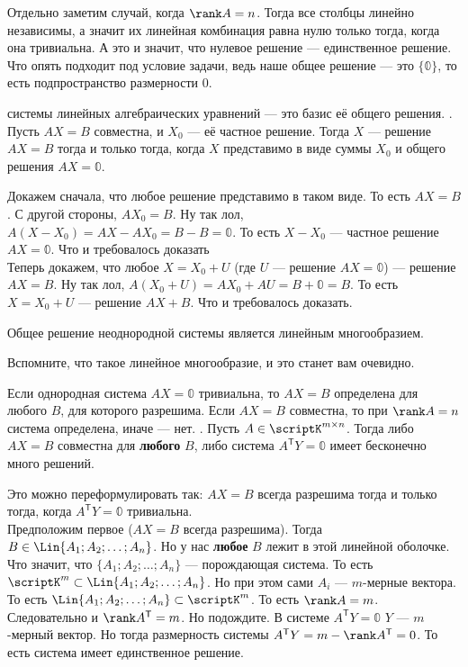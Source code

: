 \documentclass{article}
\newcommand*{\trans}{^{\mathsf T}}
\begin{document}
\begin{itemize}
\begin{Proof}
            Отдельно заметим случай, когда $\rank A=n$. Тогда все столбцы линейно независимы, а значит их линейная комбинация равна нулю только тогда, когда она тривиальна. А это и значит, что нулевое решение --- единственное решение. Что опять подходит под условие задачи, ведь наше общее решение --- это $\{\mathbb0\}$, то есть подпространство размерности 0.
        \end{Proof}
        \dfn {} системы линейных алгебраических уравнений --- это базис её общего решения.
        \thm {}. Пусть $AX=B$ совместна, и $X_0$ --- её частное решение. Тогда $X$ --- решение $AX=B$ тогда и только тогда, когда $X$ представимо в виде суммы $X_0$ и общего решения $AX=\mathbb0$.
        \begin{Proof}
            Докажем сначала, что любое решение представимо в таком виде. То есть $AX=B$. С другой стороны, $AX_0=B$. Ну так лол, $A(X-X_0)=AX-AX_0=B-B=\mathbb0$. То есть $X-X_0$ --- частное решение $AX=\mathbb0$. Что и требовалось доказать\\
            Теперь докажем, что любое $X=X_0+U$ (где $U$ --- решение $AX=\mathbb0$) --- решение $AX=B$. Ну так лол, $A(X_0+U)=AX_0+AU=B+\mathbb0=B$. То есть $X=X_0+U$ --- решение $AX+B$. Что и требовалось доказать.
        \end{Proof}
        \thm Общее решение неоднородной системы является линейным многообразием.
        \begin{Proof}
            Вспомните, что такое линейное многообразие, и это станет вам очевидно.
        \end{Proof}
        \thm Если однородная система $AX=\mathbb0$ тривиальна, то $AX=B$ определена для любого $B$, для которого разрешима.
        \thm Если $AX=B$ совместна, то при $\rank A=n$ система определена, иначе --- нет.
        \thm {}. Пусть $A\in\scriptK^{m\times n}$. Тогда либо $AX=B$ совместна для \textbf{любого} $B$, либо система $A\trans Y=\mathbb0$ имеет бесконечно много решений.
        \begin{Proof}
            Это можно переформулировать так: $AX=B$ всегда разрешима тогда и только тогда, когда $A\trans Y=\mathbb0$ тривиальна.\\
            Предположим первое ($AX=B$ всегда разрешима). Тогда $B\in\Lin\{A_1;A_2;\ldots;A_n\}$. Но у нас \textbf{любое} $B$ лежит в этой линейной оболочке. Что значит, что $\{A_1;A_2;\ldots;A_n\}$ --- порождающая система. То есть $\scriptK^m\subset\Lin\{A_1;A_2;\ldots;A_n\}$. Но при этом сами $A_i$ --- $m$-мерные вектора. То есть $\Lin\{A_1;A_2;\ldots;A_n\}\subset\scriptK^m$. То есть $\rank A=m$. Следовательно и $\rank A\trans=m$. Но подождите. В системе $A\trans Y=\mathbb0$ $Y$ --- $m$-мерный вектор. Но тогда размерность системы $A\trans Y=m-\rank A\trans=0$. То есть система имеет единственное решение.\\

\end{Proof}
\end{itemize}
\end{document}
